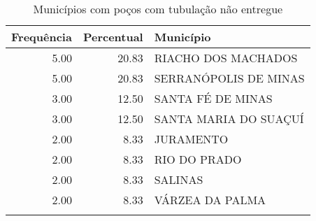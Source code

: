 \documentclass[a4paper, 12pt, openright, oneside, english, brazil, article]{abntex2}
\begin{document}
	

	


	
	\begin{scriptsize}
	\begin{longtable}{rrl}
		\caption{Municípios com poços com tubulação não entregue} \\ 
		\hline
		Frequência & Percentual & Município \\ 
		\hline
		5.00 & 20.83 & RIACHO DOS MACHADOS \\ 
		5.00 & 20.83 & SERRANÓPOLIS DE MINAS \\ 
		3.00 & 12.50 & SANTA FÉ DE MINAS \\ 
		3.00 & 12.50 & SANTA MARIA DO SUAÇUÍ \\ 
		2.00 & 8.33 & JURAMENTO \\ 
		2.00 & 8.33 & RIO DO PRADO \\ 
		2.00 & 8.33 & SALINAS \\ 
		2.00 & 8.33 & VÁRZEA DA PALMA \\ 
		\hline
		\hline
		\label{motivo3}
	\end{longtable}
	\end{scriptsize}

	
\end{document}
